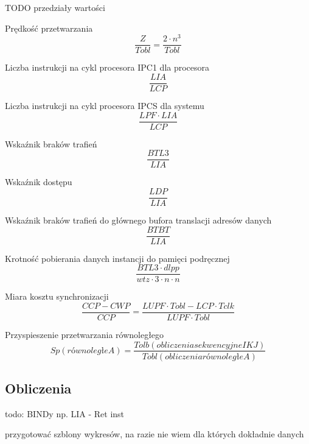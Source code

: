 \documentclass[12pt,a4paper]{article}
\begin{document}
{\huge TODO przedziały wartości}

Prędkość przetwarzania
\begin{equation}
\frac{Z}{Tobl} = \frac{2 \cdot n^3}{Tobl}
\end{equation}

Liczba instrukcji na cykl procesora IPC1 dla procesora
\begin{equation}
\frac{LIA}{LCP}
\end{equation}

Liczba instrukcji na cykl procesora IPCS dla systemu
\begin{equation}
\frac{LPF \cdot LIA}{LCP}
\end{equation}

Wskaźnik braków trafień
\begin{equation}
\frac{BTL3}{LIA}
\end{equation}

Wskaźnik dostępu
\begin{equation}
\frac{LDP}{LIA}
\end{equation}

Wskaźnik braków trafień do głównego bufora translacji adresów danych
\begin{equation}
\frac{BTBT}{LIA}
\end{equation}

Krotność pobierania danych instancji do pamięci podręcznej
\begin{equation}
\frac{BTL3 \cdot dlpp}{wtz \cdot 3 \cdot n \cdot n}
\end{equation}

Miara kosztu synchronizacji
\begin{equation}
\frac{CCP - CWP}{CCP} = \frac{LUPF \cdot Tobl - LCP \cdot Tclk}{LUPF \cdot Tobl}
\end{equation}

Przyspieszenie przetwarzania równoległego
\begin{equation}
Sp(równoległe A) = \frac{Tolb(obliczenia sekwencyjne IKJ)}{Tobl(obliczenia równoległe A)}
\end{equation}


\subsection{Obliczenia}
todo: BINDy np. LIA - Ret inst

przygotować szblony wykresów, na razie nie  wiem dla których dokładnie danych 


\end{document}
